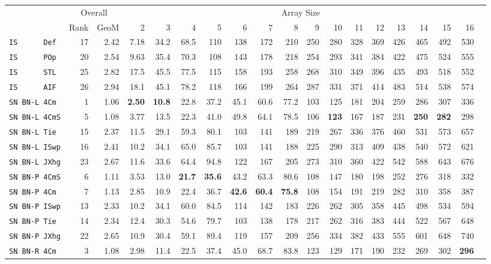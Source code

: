 \begin{tabular}{l | r @{~~} r | r@{~~}r@{~~}r@{~~}r@{~~}r@{~~}r@{~~}r@{~~}r@{~~}r@{~~}r@{~~}r@{~~}r@{~~}r@{~~}r@{~~}r@{~~}r|}
 & \multicolumn{2}{c|}{Overall} & \multicolumn{15}{c}{Array Size} \\
 & Rank & GeoM & 2&3&4&5&6&7&8&9&10&11&12&13&14&15&16\\ \hline
\verb+IS      Def+ & 17 & 2.42 & 7.18&34.2&68.5&110&138&172&210&250&280&328&369&426&465&492&530\\
\verb+IS      POp+ & 20 & 2.54 & 9.63&35.4&70.3&108&143&178&218&254&293&341&384&422&475&524&555\\
\verb+IS      STL+ & 25 & 2.82 & 17.5&45.5&77.5&115&158&193&258&268&310&349&396&435&493&518&552\\
\verb+IS      AIF+ & 26 & 2.94 & 18.1&45.1&78.2&118&166&199&264&287&331&371&414&483&514&538&574\smallskip \\
\verb+SN BN-L 4Cm + & 1 & 1.06 & \textbf{2.50}&\textbf{10.8}&22.8&37.2&45.1&60.6&77.2&103&125&181&204&259&286&307&336\\
\verb+SN BN-L 4CmS+ & 5 & 1.08 & 3.77&13.5&22.3&41.0&49.8&64.1&78.5&106&\textbf{123}&167&187&231&\textbf{250}&\textbf{282}&298\\
\verb+SN BN-L Tie + & 15 & 2.37 & 11.5&29.1&59.3&80.1&103&141&189&219&267&336&376&460&531&573&657\\
\verb+SN BN-L ISwp+ & 16 & 2.41 & 10.2&34.1&65.0&85.7&103&141&188&225&290&313&409&438&540&572&621\\
\verb+SN BN-L JXhg+ & 23 & 2.67 & 11.6&33.6&64.4&94.8&122&167&205&273&310&360&422&542&588&643&676\smallskip \\
\verb+SN BN-P 4CmS+ & 6 & 1.11 & 3.53&13.0&\textbf{21.7}&\textbf{35.6}&43.2&63.3&80.6&108&147&180&198&252&276&318&332\\
\verb+SN BN-P 4Cm + & 7 & 1.13 & 2.85&10.9&22.4&36.7&\textbf{42.6}&\textbf{60.4}&\textbf{75.8}&108&154&191&219&282&310&358&387\\
\verb+SN BN-P ISwp+ & 13 & 2.33 & 10.2&34.1&60.0&84.5&114&142&183&226&262&305&358&445&498&534&594\\
\verb+SN BN-P Tie + & 14 & 2.34 & 12.4&30.3&54.6&79.7&103&138&178&217&262&316&383&444&522&567&648\\
\verb+SN BN-P JXhg+ & 22 & 2.65 & 10.9&30.4&59.1&89.4&119&157&209&256&334&382&433&555&601&648&740\smallskip \\
\verb+SN BN-R 4Cm + & 3 & 1.08 & 2.98&11.4&22.5&37.4&45.0&68.7&83.8&123&129&171&190&232&269&302&\textbf{296}\\

\end{tabular}
